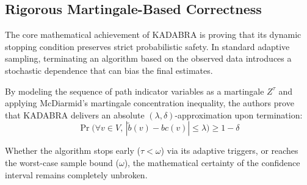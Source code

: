 \subsection{Rigorous Martingale-Based Correctness}
The core mathematical achievement of KADABRA is proving that its dynamic stopping condition preserves strict probabilistic safety. In standard adaptive sampling, terminating an algorithm based on the observed data introduces a stochastic dependence that can bias the final estimates. 

By modeling the sequence of path indicator variables as a martingale $Z^\tau$ and applying McDiarmid's martingale concentration inequality, the authors prove that KADABRA delivers an absolute $(\lambda, \delta)$-approximation upon termination:
\begin{equation}
\Pr\Big(\forall v \in V, \, |\tilde{b}(v) - bc(v)| \le \lambda\Big) \ge 1 - \delta
\end{equation}

Whether the algorithm stops early ($\tau < \omega$) via its adaptive triggers, or reaches the worst-case sample bound ($\omega$), the mathematical certainty of the confidence interval remains completely unbroken.



